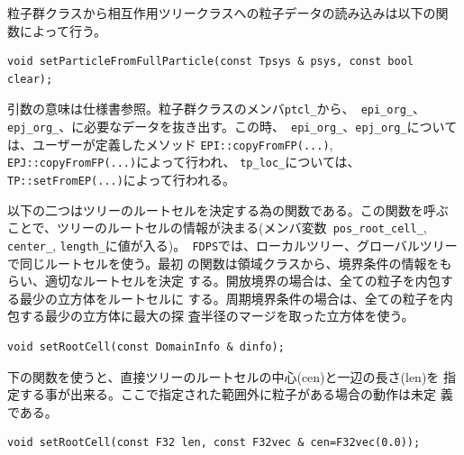 
粒子群クラスから相互作用ツリークラスへの粒子データの読み込みは以下の関
数によって行う。

\begin{screen}
\begin{verbatim}
void setParticleFromFullParticle(const Tpsys & psys, const bool clear);
\end{verbatim}
\end{screen}

引数の意味は仕様書参照。粒子群クラスのメンバ{\tt ptcl\_}から、{\tt
epi\_org\_}、{\tt epj\_org\_}、に必要なデータを抜き出す。この時、{\tt
epi\_org\_}、{\tt epj\_org\_}については、ユーザーが定義したメソッド
{\tt EPI::copyFromFP(...)}, {\tt EPJ::copyFromFP(...)}によって行われ、
{\tt tp\_loc\_}については、{\tt TP::setFromEP(...)}によって行われる。



以下の二つはツリーのルートセルを決定する為の関数である。この関数を呼ぶ
ことで、ツリーのルートセルの情報が決まる(メンバ変数{\tt
pos\_root\_cell\_}, {\tt center\_}, {\tt length\_}に値が入る)。{\tt
FDPS}では、ローカルツリー、グローバルツリーで同じルートセルを使う。最初
の関数は領域クラスから、境界条件の情報をもらい、適切なルートセルを決定
する。開放境界の場合は、全ての粒子を内包する最少の立方体をルートセルに
する。周期境界条件の場合は、全ての粒子を内包する最少の立方体に最大の探
査半径のマージを取った立方体を使う。

\begin{screen}
\begin{verbatim}
void setRootCell(const DomainInfo & dinfo);
\end{verbatim}
\end{screen}


下の関数を使うと、直接ツリーのルートセルの中心(cen)と一辺の長さ(len)を
指定する事が出来る。ここで指定された範囲外に粒子がある場合の動作は未定
義である。

\begin{screen}
\begin{verbatim}
void setRootCell(const F32 len, const F32vec & cen=F32vec(0.0));
\end{verbatim}
\end{screen}

